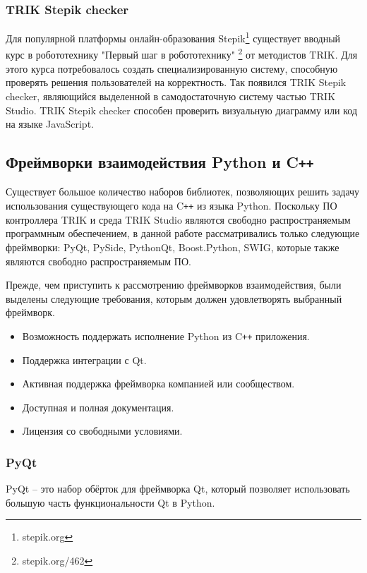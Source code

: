 \documentclass[14pt]{matmex-diploma-custom}
\begin{document}
\subsubsection{TRIK Stepik checker}
Для популярной платформы онлайн-образования Stepik\footnote{stepik.org} существует вводный курс в робототехнику "Первый шаг в робототехнику" \footnote{stepik.org/462} от методистов TRIK. Для этого курса потребовалось создать специализированную систему, способную проверять решения пользователей на корректность. Так появился TRIK Stepik checker, являющийся выделенной в самодостаточную систему частью TRIK Studio. TRIK Stepik checker способен проверить визуальную диаграмму или код на языке JavaScript.

\subsection{Фреймворки взаимодействия Python и C\texttt{++}}

Существует большое количество наборов библиотек, позволяющих решить задачу использования существующего кода на C\texttt{++} из языка Python. Поскольку ПО контроллера TRIK и среда TRIK Studio являются свободно распространяемым программным обеспечением, в данной работе рассматривались только следующие фреймворки: PyQt, PySide, PythonQt, Boost.Python, SWIG, которые также являются свободно распространяемым ПО.

Прежде, чем приступить к рассмотрению фреймворков взаимодействия, были выделены следующие требования, которым должен удовлетворять выбранный фреймворк.

\begin{itemize}
    \item Возможность поддержать исполнение Python из C\texttt{++} приложения.
    \item Поддержка интеграции с Qt.
    \item Активная поддержка фреймворка компанией или сообществом.
    \item Доступная и полная документация.
    \item Лицензия со свободными условиями.
\end{itemize}

\subsubsection{PyQt}

PyQt \cite{pyqt} -- это набор обёрток для фреймворка Qt, который позволяет использовать большую часть функциональности Qt в Python. 
\end{document}
